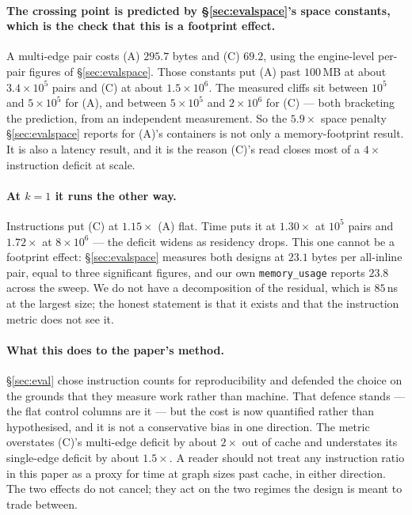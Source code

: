 \documentclass[11pt,a4paper]{article}
\theoremstyle{plain}
\theoremstyle{definition}
\theoremstyle{remark}
\begin{document}
\paragraph{The crossing point is predicted by \S\ref{sec:evalspace}'s space
constants, which is the check that this is a footprint effect.} A multi-edge pair
costs (A) $295.7$ bytes and (C) $69.2$, using the engine-level per-pair figures
of \S\ref{sec:evalspace}. Those constants put (A) past $100$\,MB at about
$3.4\times10^5$ pairs and (C) at about $1.5\times10^6$. The measured cliffs sit
between $10^5$ and $5\times10^5$ for (A), and between $5\times10^5$ and
$2\times10^6$ for (C) --- both bracketing the prediction, from an independent
measurement. So the $5.9\times$ space penalty \S\ref{sec:evalspace} reports for
(A)'s containers is not only a memory-footprint result. It is also a latency
result, and it is the reason (C)'s read closes most of a $4\times$ instruction
deficit at scale.

\paragraph{At $k=1$ it runs the other way.} Instructions put (C) at $1.15\times$
(A) flat. Time puts it at $1.30\times$ at $10^5$ pairs and $1.72\times$ at
$8\times10^6$ --- the deficit widens as residency drops. This one cannot be a
footprint effect: \S\ref{sec:evalspace} measures both designs at $23.1$ bytes per
all-inline pair, equal to three significant figures, and our own
\texttt{memory\_usage} reports $23.8$ across the sweep. We do not have a
decomposition of the residual, which is $85$\,ns at the largest size; the honest
statement is that it exists and that the instruction metric does not see it.

\paragraph{What this does to the paper's method.} \S\ref{sec:eval} chose
instruction counts for reproducibility and defended the choice on the grounds
that they measure work rather than machine. That defence stands --- the flat
control columns are it --- but the cost is now quantified rather than
hypothesised, and it is not a conservative bias in one direction. The metric
overstates (C)'s multi-edge deficit by about $2\times$ out of cache and
understates its single-edge deficit by about $1.5\times$. A reader should not
treat any instruction ratio in this paper as a proxy for time at graph sizes past
cache, in either direction. The two effects do not cancel; they act on the two
regimes the design is meant to trade between.
\end{document}
